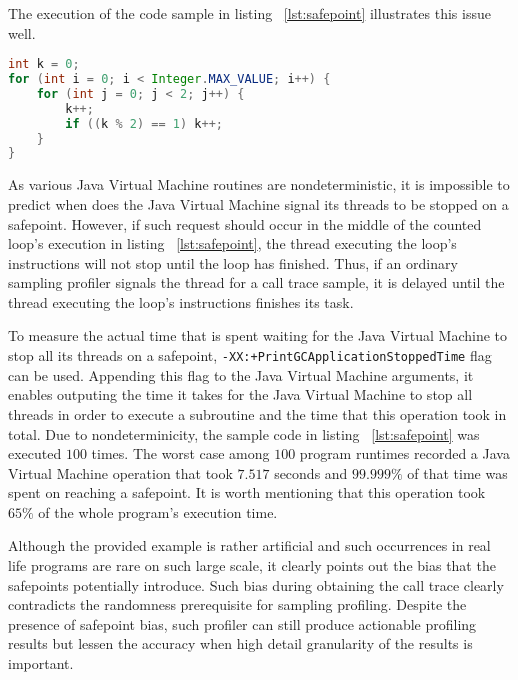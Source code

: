 \documentclass[..thesis.tex]{subfiles}
\begin{document}
The execution of the code sample in listing ~\ref{lst:safepoint} illustrates this issue well. 
  
\begin{lstlisting}[language=java,style=def,label={lst:safepoint}, caption={Counted loops do not contain safepoints}]
int k = 0;
for (int i = 0; i < Integer.MAX_VALUE; i++) {
	for (int j = 0; j < 2; j++) {
    	k++;
    	if ((k % 2) == 1) k++;
	}
}
\end{lstlisting}
As various Java Virtual Machine routines are nondeterministic, it is impossible to predict when does the Java Virtual Machine signal its threads to be stopped on a safepoint. However, if such request should occur in the middle of the counted loop's execution in listing ~\ref{lst:safepoint}, the thread executing the loop's instructions will not stop until the loop has finished. Thus, if an ordinary sampling profiler signals the thread for a call trace sample, it is delayed until the thread executing the loop's instructions finishes its task. \cite{wakart_psychosomatic_2015}

To measure the actual time that is spent waiting for the Java Virtual Machine to stop all its threads on a safepoint, \texttt{-XX:+PrintGCApplicationStoppedTime} flag can be used. Appending this flag to the Java Virtual Machine arguments, it enables outputing the time it takes for the Java Virtual Machine to stop all threads in order to execute a subroutine and the time that this operation took in total. Due to nondeterminicity, the sample code in listing ~\ref{lst:safepoint} was executed $100$ times. The worst case among $100$ program runtimes recorded a Java Virtual Machine operation that took $7.517$ seconds and $99.999\%$ of that time was spent on reaching a safepoint. It is worth mentioning that this operation took $65\%$ of the whole program's execution time.

Although the provided example is rather artificial and such occurrences in real life programs are rare on such large scale, it clearly points out the bias that the safepoints potentially introduce. Such bias during obtaining the call trace clearly contradicts the randomness prerequisite for sampling profiling. Despite the presence of safepoint bias, such profiler can still produce actionable profiling results but lessen the accuracy when high detail granularity of the results is important.
\end{document}
